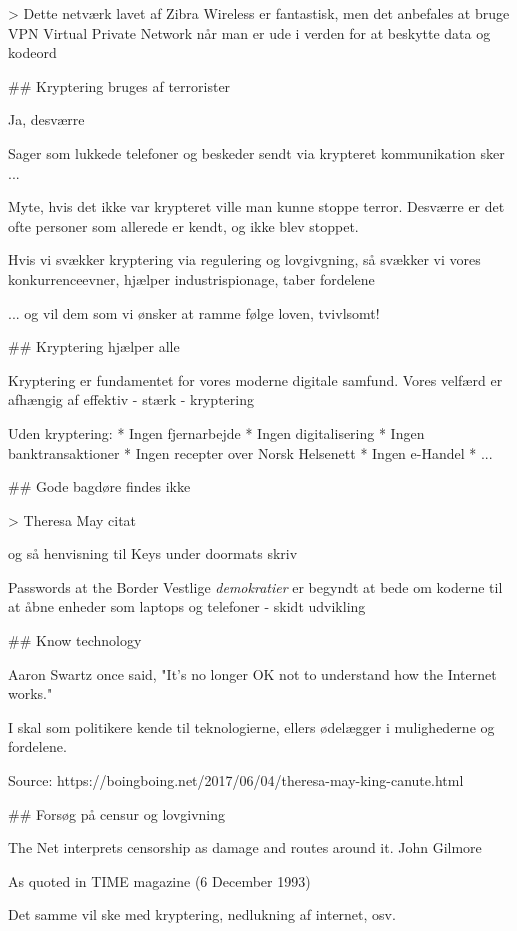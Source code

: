 \documentclass[20pt,landscape,a4paper,footrule]{foils}
\begin{document}
> Dette netværk lavet af Zibra Wireless er fantastisk, men det anbefales at bruge VPN Virtual Private Network når man er ude i verden for at beskytte data og kodeord



## Kryptering bruges af terrorister

Ja, desværre

Sager som lukkede telefoner og beskeder sendt via krypteret kommunikation sker ...

Myte, hvis det ikke var krypteret ville man kunne stoppe terror. Desværre er det ofte personer som allerede er kendt, og ikke blev stoppet.

Hvis vi svækker kryptering via regulering og lovgivgning, så svækker vi vores konkurrenceevner, hjælper industrispionage, taber fordelene

... og vil dem som vi ønsker at ramme følge loven, tvivlsomt!

## Kryptering hjælper alle

Kryptering er fundamentet for vores moderne digitale samfund. Vores velfærd er afhængig af effektiv - stærk - kryptering

Uden kryptering:
* Ingen fjernarbejde
* Ingen digitalisering
* Ingen banktransaktioner
* Ingen recepter over Norsk Helsenett
* Ingen e-Handel
* ...



## Gode bagdøre findes ikke

> Theresa May citat

og så henvisning til Keys under doormats skriv

Passwords at the Border
Vestlige \emph{demokratier} er begyndt at bede om koderne til at åbne enheder som laptops og telefoner - skidt udvikling


## Know technology

Aaron Swartz once said, "It's no longer OK not to understand how the Internet works."

I skal som politikere kende til teknologierne, ellers ødelægger i mulighederne og fordelene.

Source:
https://boingboing.net/2017/06/04/theresa-may-king-canute.html

## Forsøg på censur og lovgivning

The Net interprets censorship as damage and routes around it. John Gilmore

As quoted in TIME magazine (6 December 1993)

Det samme vil ske med kryptering, nedlukning af internet, osv.
\end{document}
